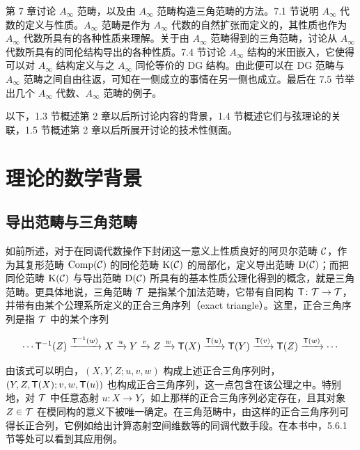 第 7 章讨论 $A_\infty$ 范畴，以及由 $A_\infty$ 范畴构造三角范畴的方法。7.1 节说明 $A_\infty$ 代数的定义与性质。$A_\infty$ 范畴是作为 $A_\infty$ 代数的自然扩张而定义的，其性质也作为 $A_\infty$ 代数所具有的各种性质来理解。关于由 $A_\infty$ 范畴得到的三角范畴，讨论从 $A_\infty$ 代数所具有的同伦结构导出的各种性质。7.4 节讨论 $A_\infty$ 结构的米田嵌入，它使得可以对 $A_\infty$ 结构定义与之 $A_\infty$ 同伦等价的 DG 结构。由此便可以在 DG 范畴与 $A_\infty$ 范畴之间自由往返，可知在一侧成立的事情在另一侧也成立。最后在 7.5 节举出几个 $A_\infty$ 代数、$A_\infty$ 范畴的例子。

以下，1.3 节概述第 2 章以后所讨论内容的背景，1.4 节概述它们与弦理论的关联，1.5 节概述第 2 章以后所展开讨论的技术性侧面。


\section{理论的数学背景}

\subsection{导出范畴与三角范畴}

如前所述，对于在同调代数操作下封闭这一意义上性质良好的阿贝尔范畴 $\mathcal{C}$，作为其复形范畴 $\operatorname{Comp}(\mathcal{C})$ 的同伦范畴 $\mathrm{K}(\mathcal{C})$ 的局部化，定义导出范畴 $\mathrm{D}(\mathcal{C})$；而把同伦范畴 $\mathrm{K}(\mathcal{C})$ 与导出范畴 $\mathrm{D}(\mathcal{C})$ 所具有的基本性质公理化得到的概念，就是三角范畴。更具体地说，三角范畴 $\mathcal{T}$ 是指某个加法范畴，它带有自同构 $\mathsf{T}\colon \mathcal{T}\to\mathcal{T}$，并带有由某个公理系所定义的正合三角序列（exact triangle）。这里，正合三角序列是指 $\mathcal{T}$ 中的某个序列

\[\cdots \mathsf{T}^{-1}(Z)\xrightarrow{\mathsf{T}^{-1}(w)} X\xrightarrow{u} Y\xrightarrow{v} Z\xrightarrow{w} \mathsf{T}(X)\xrightarrow{\mathsf{T}(u)} \mathsf{T}(Y)\xrightarrow{\mathsf{T}(v)} \mathsf{T}(Z)\xrightarrow{\mathsf{T}(w)} \cdots\]

由该式可以明白，$(X,Y,Z;u,v,w)$ 构成上述正合三角序列时，$(Y,Z,\mathsf{T}(X);v,w,\mathsf{T}(u))$ 也构成正合三角序列，这一点包含在该公理之中。特别地，对 $\mathcal{T}$ 中任意态射 $u\colon X\to Y$，如上那样的正合三角序列必定存在，且其对象 $Z\in\mathcal{T}$ 在模同构的意义下被唯一确定。在三角范畴中，由这样的正合三角序列可得长正合列，它例如给出计算态射空间维数等的同调代数手段。在本书中，5.6.1 节等处可以看到其应用例。

